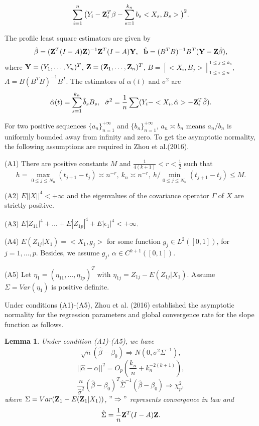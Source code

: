\documentclass[preprint,12pt]{elsarticle}
\newtheorem{lemma}{Lemma}
\begin{document}
	\[\sum_{i=1}^n\big (Y_i-{\bf Z}_i^T\beta-\sum_{s=1}^{k_n}b_s<X_s,B_s>\big )^2.\]
	
	The profile least square estimators are given by	
	\[\hat{\beta}=({\bf Z}^T(I-A){\bf Z})^{-1}{\bf Z}^T(I-A){\bf Y},\ \ \hat{\bf b}=(B^TB)^{-1}B^T({\bf Y}-{\bf Z}\hat{\beta}),\]
	where
	${\bf Y}=(Y_1,\dots,Y_n)^T$, ${\bf Z}=({\bf Z}_1,\dots,{\bf Z}_n)^T$, $B=[<X_i,B_j>]_{1\leq i\leq n}^{1\leq j\leq k_n}$, $A=B(B^TB)^{-1}B^T$. The estimators of $\alpha(t)$ and $\sigma^2$ are
	\[\hat{\alpha}(t)=\sum_{s=1}^{k_n}\hat{b}_sB_s,\ \ \hat{\sigma}^2=\frac{1}{n}\sum(Y_i-<X_i,\hat{\alpha}>-{\bf Z}_i^T\hat{\beta}).\]

	For two positive sequences $\{a_n\}_{n=1}^{+\infty}$ and $\{b_n\}_{n=1}^{+\infty}$, $a_n\asymp b_n$ means $a_n/b_n$ is uniformly bounded away from infinity and zero. To get the asymptotic normality, the following assumptions are required in Zhou et al.(2016). 
	
	(A1) There are positive constants $M$ and $\frac{1}{4(k+1)}<r<\frac{1}{2}$ such that
	\[h=\max_{0\leq j\leq N_n}(t_{j+1}-t_j)\asymp n^{-r},\ k_n\asymp n^{-r},\ h/\min_{0\leq j\leq N_n}(t_{j+1}-t_j)\leq M.\]
	
	(A2) $E||X||^4<+\infty$ and the eigenvalues of the covariance operator $\Gamma$ of $X$ are strictly positive.
	
	(A3) $E|Z_{11}|^4+\dots+E|Z_{1p}|^4+E|\epsilon_1|^4<+\infty$.
	
	(A4) $E(Z_{1j}|X_1)=<X_1,g_j>$ for some function $g_j\in L^2([0,1])$, for $j=1,\dots, p$. Besides, we assume $g_j$, $\alpha\in C^{k+1}([0,1])$.
	
	(A5) Let $\eta_1=(\eta_{11},\dots,\eta_{1p})^T$ with $\eta_{1j}=Z_{1j}-E(Z_{1j}|X_1)$. Assume $\Sigma=Var(\eta_1)$ is positive definite. 
	
	Under conditions (A1)-(A5), Zhou et al. (2016) established the asymptotic normality for the regression parameters and global convergence rate for the slope function as follows.
	
	\begin{lemma} Under condition (A1)-(A5), we have
		\[\sqrt{n}(\hat{\beta}-\beta_0)\Rightarrow N(0,\sigma^2\Sigma^{-1}),\]
		\[||\hat{\alpha}-\alpha||^2=O_p(\frac{k_n}{n}+k_n^{-2(k+1)}),\]
		\[\frac{n}{\hat{\sigma}^2}(\hat{\beta}-\beta_0)^T\hat{\Sigma}^{-1}(\hat{\beta}-\beta_0)\Rightarrow \chi^2_p,\]
		where $\Sigma=Var({\bf Z}_1-E({\bf Z}_1|X_1))$, $"\Rightarrow"$ represents convergence in law and
		\[\hat{\Sigma}=\frac{1}{n}{\bf Z}^T(I-A){\bf Z}.\]
	\end{lemma}
\end{document}

